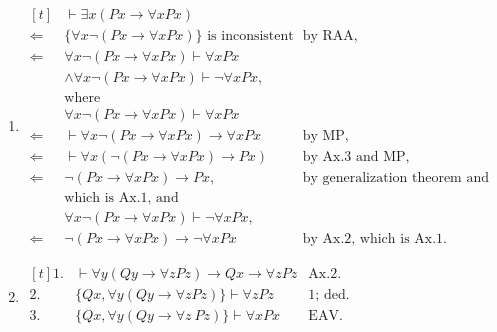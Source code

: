 \begin{enumerate}[label=(\alph*)]
  \item
        $\begin{aligned}[t]
                       & \vdash\exists x(Px\to \forall xPx)                                                                             \\
            \Leftarrow & \{\forall x\neg(Px\to \forall xPx)\}\text{ is inconsistent}         & \text{by RAA,}                           \\
            \Leftarrow & \forall x\neg(Px\to \forall xPx)\vdash \forall xPx                                                             \\
                       & \wedge      \forall x\neg(Px\to \forall xPx)\vdash \neg\forall xPx,                                            \\
                       & \text{where}                                                                                                   \\
                       & \forall x\neg(Px\to \forall xPx)\vdash \forall xPx                                                             \\
            \Leftarrow & \vdash\forall x\neg(Px\to \forall xPx)\to \forall xPx               & \text{by MP,}                            \\
            \Leftarrow & \vdash\forall x(\neg(Px\to \forall xPx)\to Px)                      & \text{by Ax.3 and MP,}                   \\
            \Leftarrow & \neg(Px\to \forall xPx)\to Px,                                      & \text{by generalization theorem and MP,} \\
                       & \text{which is Ax.1, and}                                                                                      \\
                       & \forall x\neg(Px\to \forall xPx)\vdash \neg\forall xPx,                                                        \\
            \Leftarrow & \neg(Px\to \forall xPx)\to \neg\forall x Px                         & \text{by Ax.2, which is Ax.1.}
          \end{aligned}$
  \item
        $\begin{aligned}[t]
            1. & \vdash \forall y(Qy\to \forall zPz)\to Qx\to\forall zPz        & \text{Ax.2.}   \\
            2. & \{Qx,\forall y(Qy\to\forall zPz)\}\vdash \forall zPz           & \text{1; ded.} \\
            3. & \{Qx, \forall y(Qy\rightarrow\forall z\ Pz)\}\vdash\forall xPx & \text{EAV.}    \\
          \end{aligned}$
\end{enumerate}


